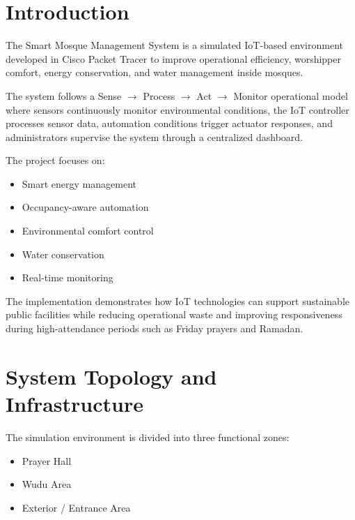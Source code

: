 \documentclass[12pt, a4paper]{article}
\begin{document}
\tableofcontents
\newpage

\section{Introduction}

The Smart Mosque Management System is a simulated IoT-based environment developed in Cisco Packet Tracer to improve operational efficiency, worshipper comfort, energy conservation, and water management inside mosques.

The system follows a Sense $\rightarrow$ Process $\rightarrow$ Act $\rightarrow$ Monitor operational model where sensors continuously monitor environmental conditions, the IoT controller processes sensor data, automation conditions trigger actuator responses, and administrators supervise the system through a centralized dashboard.

The project focuses on:
\begin{itemize}
    \item Smart energy management
    \item Occupancy-aware automation
    \item Environmental comfort control
    \item Water conservation
    \item Real-time monitoring
\end{itemize}

The implementation demonstrates how IoT technologies can support sustainable public facilities while reducing operational waste and improving responsiveness during high-attendance periods such as Friday prayers and Ramadan.

\section{System Topology and Infrastructure}

The simulation environment is divided into three functional zones:
\begin{itemize}
    \item Prayer Hall
    \item Wudu Area
    \item Exterior / Entrance Area
\end{itemize}
\end{document}
